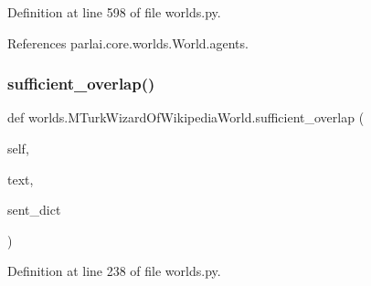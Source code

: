 Definition at line 598 of file worlds.\+py.



References parlai.\+core.\+worlds.\+World.\+agents.

\mbox{\label{classworlds_1_1MTurkWizardOfWikipediaWorld_a4b49dac2356a6684979f3b4c81057773}} 
\subsubsection{\texorpdfstring{sufficient\+\_\+overlap()}{sufficient\_overlap()}}
{\footnotesize\ttfamily def worlds.\+M\+Turk\+Wizard\+Of\+Wikipedia\+World.\+sufficient\+\_\+overlap (\begin{DoxyParamCaption}\item[{}]{self,  }\item[{}]{text,  }\item[{}]{sent\+\_\+dict }\end{DoxyParamCaption})}



Definition at line 238 of file worlds.\+py.




